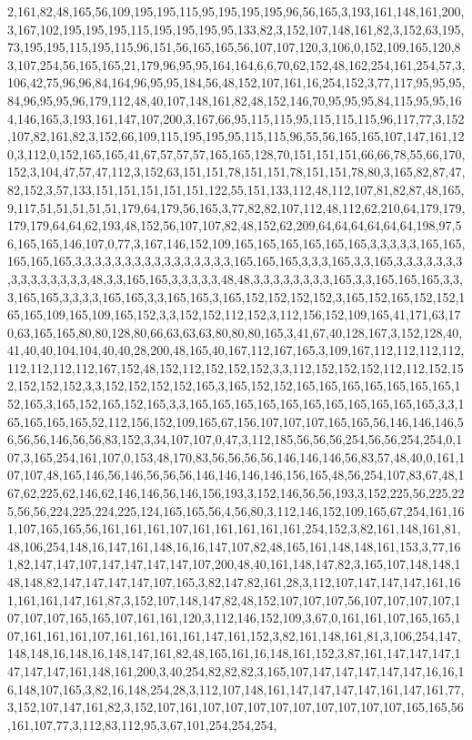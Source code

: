 2,161,82,48,165,56,109,195,195,115,95,195,195,195,96,56,165,3,193,161,148,161,200,3,167,102,195,195,195,115,195,195,195,95,133,82,3,152,107,148,161,82,3,152,63,195,73,195,195,115,195,115,96,151,56,165,165,56,107,107,120,3,106,0,152,109,165,120,83,107,254,56,165,165,21,179,96,95,95,164,164,6,6,70,62,152,48,162,254,161,254,57,3,106,42,75,96,96,84,164,96,95,95,184,56,48,152,107,161,16,254,152,3,77,117,95,95,95,84,96,95,95,96,179,112,48,40,107,148,161,82,48,152,146,70,95,95,95,84,115,95,95,164,146,165,3,193,161,147,107,200,3,167,66,95,115,115,95,115,115,115,96,117,77,3,152,107,82,161,82,3,152,66,109,115,195,195,95,115,115,96,55,56,165,165,107,147,161,120,3,112,0,152,165,165,41,67,57,57,57,165,165,128,70,151,151,151,66,66,78,55,66,170,152,3,104,47,57,47,112,3,152,63,151,151,78,151,151,78,151,151,78,80,3,165,82,87,47,82,152,3,57,133,151,151,151,151,151,122,55,151,133,112,48,112,107,81,82,87,48,165,9,117,51,51,51,51,51,179,64,179,56,165,3,77,82,82,107,112,48,112,62,210,64,179,179,179,179,64,64,62,193,48,152,56,107,107,82,48,152,62,209,64,64,64,64,64,64,198,97,56,165,165,146,107,0,77,3,167,146,152,109,165,165,165,165,165,165,3,3,3,3,3,165,165,165,165,165,3,3,3,3,3,3,3,3,3,3,3,3,3,3,3,3,165,165,165,3,3,3,165,3,3,165,3,3,3,3,3,3,3,3,3,3,3,3,3,3,3,48,3,3,165,165,3,3,3,3,3,48,48,3,3,3,3,3,3,3,3,165,3,3,165,165,165,3,3,3,165,165,3,3,3,3,165,165,3,3,165,165,3,165,152,152,152,152,3,165,152,165,152,152,165,165,109,165,109,165,152,3,3,152,152,112,152,3,112,156,152,109,165,41,171,63,170,63,165,165,80,80,128,80,66,63,63,63,80,80,80,165,3,41,67,40,128,167,3,152,128,40,41,40,40,104,104,40,40,28,200,48,165,40,167,112,167,165,3,109,167,112,112,112,112,112,112,112,112,167,152,48,152,112,152,152,152,3,3,112,152,152,152,112,112,152,152,152,152,152,3,3,152,152,152,152,165,3,165,152,152,165,165,165,165,165,165,165,152,165,3,165,152,165,152,165,3,3,165,165,165,165,165,165,165,165,165,165,165,3,3,165,165,165,165,52,112,156,152,109,165,67,156,107,107,107,165,165,56,146,146,146,56,56,56,146,56,56,83,152,3,34,107,107,0,47,3,112,185,56,56,56,254,56,56,254,254,0,107,3,165,254,161,107,0,153,48,170,83,56,56,56,56,146,146,146,56,83,57,48,40,0,161,107,107,48,165,146,56,146,56,56,56,146,146,146,146,156,165,48,56,254,107,83,67,48,167,62,225,62,146,62,146,146,56,146,156,193,3,152,146,56,56,193,3,152,225,56,225,225,56,56,224,225,224,225,124,165,165,56,4,56,80,3,112,146,152,109,165,67,254,161,161,107,165,165,56,161,161,161,107,161,161,161,161,161,254,152,3,82,161,148,161,81,48,106,254,148,16,147,161,148,16,16,147,107,82,48,165,161,148,148,161,153,3,77,161,82,147,147,107,147,147,147,147,107,200,48,40,161,148,147,82,3,165,107,148,148,148,148,82,147,147,147,147,107,165,3,82,147,82,161,28,3,112,107,147,147,147,161,161,161,161,147,161,87,3,152,107,148,147,82,48,152,107,107,107,56,107,107,107,107,107,107,107,165,165,107,161,161,120,3,112,146,152,109,3,67,0,161,161,107,165,165,107,161,161,161,107,161,161,161,161,147,161,152,3,82,161,148,161,81,3,106,254,147,148,148,16,148,16,148,147,161,82,48,165,161,16,148,161,152,3,87,161,147,147,147,147,147,147,161,148,161,200,3,40,254,82,82,82,3,165,107,147,147,147,147,147,16,16,16,148,107,165,3,82,16,148,254,28,3,112,107,148,161,147,147,147,147,161,147,161,77,3,152,107,147,161,82,3,152,107,161,107,107,107,107,107,107,107,107,107,165,165,56,161,107,77,3,112,83,112,95,3,67,101,254,254,254,